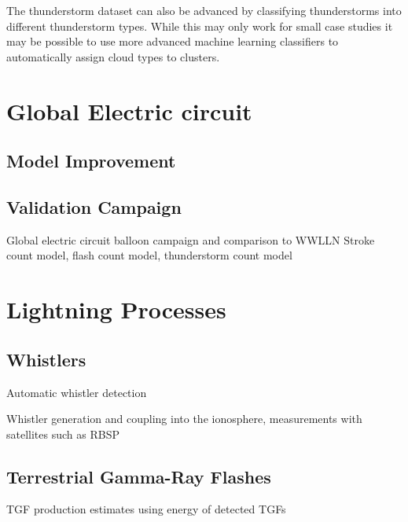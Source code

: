 The thunderstorm dataset can also be advanced by classifying thunderstorms into different thunderstorm types.
While this may only work for small case studies it may be possible to use more advanced machine learning classifiers to automatically assign cloud types to clusters.

\section{Global Electric circuit}

\subsection{Model Improvement}

\subsection{Validation Campaign}

Global electric circuit balloon campaign and comparison to WWLLN
  Stroke count model, flash count model, thunderstorm count model

\section{Lightning Processes}

\subsection{Whistlers}

  Automatic whistler detection

Whistler generation and coupling into the ionosphere, measurements with satellites such as RBSP

\subsection{Terrestrial Gamma-Ray Flashes}

 TGF production estimates using energy of detected TGFs





